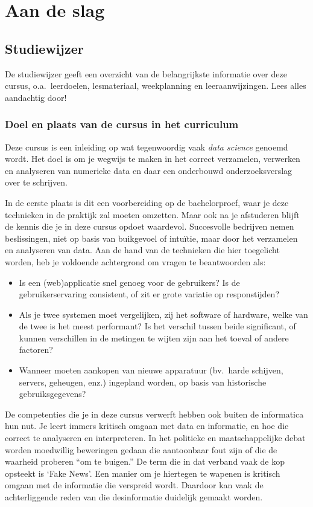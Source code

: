 \chapter{Aan de slag}
\label{ch:aan-de-slag}

\section{Studiewijzer}

De studiewijzer geeft een overzicht van de belangrijkste informatie over deze cursus, o.a.~leerdoelen, lesmateriaal, weekplanning en leeraanwijzingen. Lees alles aandachtig door!

\subsection{Doel en plaats van de cursus in het curriculum}

Deze cursus is een inleiding op wat tegenwoordig vaak \emph{data science} genoemd wordt. Het doel is om je wegwijs te maken in het correct verzamelen, verwerken en analyseren van numerieke data en daar een onderbouwd onderzoeksverslag over te schrijven.

In de eerste plaats is dit een voorbereiding op de bachelorproef, waar je deze technieken in de praktijk zal moeten omzetten. Maar ook na je afstuderen blijft de kennis die je in deze cursus opdoet waardevol. Succesvolle bedrijven nemen beslissingen, niet op basis van buikgevoel of intuïtie, maar door het verzamelen en analyseren van data. Aan de hand van de technieken die hier toegelicht worden, heb je voldoende achtergrond om vragen te beantwoorden als:

\begin{itemize}
  \item Is een (web)applicatie snel genoeg voor de gebruikers? Is de gebruikerservaring consistent, of zit er grote variatie op responstijden?
  \item Als je twee systemen moet vergelijken, zij het software of hardware, welke van de twee is het meest performant? Is het verschil tussen beide significant, of kunnen verschillen in de metingen te wijten zijn aan het toeval of andere factoren?
  \item Wanneer moeten aankopen van nieuwe apparatuur (bv.~harde schijven, servers, geheugen, enz.) ingepland worden, op basis van historische gebruiksgegevens?
\end{itemize}

De competenties die je in deze cursus verwerft hebben ook buiten de informatica hun nut. Je leert immers kritisch omgaan met data en informatie, en hoe die correct te analyseren en interpreteren. In het politieke en maatschappelijke debat worden moedwillig beweringen gedaan die aantoonbaar fout zijn of die de waarheid proberen ``om te buigen.'' De term die in dat verband vaak de kop opsteekt is `Fake News'. Een manier om je hiertegen te wapenen is kritisch omgaan met de informatie die verspreid wordt. Daardoor kan vaak de achterliggende reden van die desinformatie duidelijk gemaakt worden.

